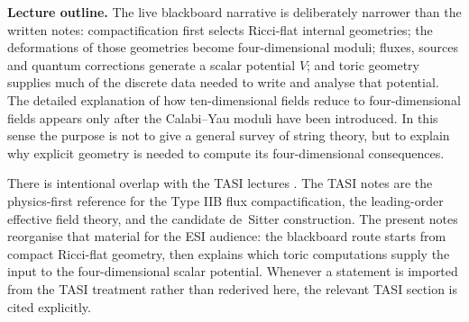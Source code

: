 \medskip
\noindent\textbf{Lecture outline.}
The live blackboard narrative is deliberately narrower than the
written notes: compactification first selects Ricci-flat internal
geometries; the deformations of those geometries become
four-dimensional moduli; fluxes, sources and quantum corrections
generate a scalar potential $V$; and toric geometry supplies much
of the discrete data needed to write and analyse that potential. The
detailed explanation of how ten-dimensional fields reduce to
four-dimensional fields appears only after the Calabi--Yau moduli
have been introduced. In this sense the purpose is not to give a
general survey of string theory, but to explain why explicit
geometry is needed to compute its four-dimensional consequences.



There is intentional overlap with the TASI lectures
\cite{McAllister:2025qwq}. The TASI notes are the physics-first
reference for the Type IIB flux compactification, the leading-order
effective field theory, and the candidate de~Sitter construction.
The present notes reorganise that material for the ESI audience: the
blackboard route starts from compact Ricci-flat geometry, then
explains which toric computations supply the input to the
four-dimensional scalar potential. Whenever a statement is imported
from the TASI treatment rather than rederived here, the relevant TASI
section is cited explicitly.

